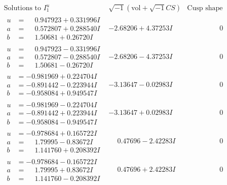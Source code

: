 \documentclass[1p]{elsarticle_modified}
\theoremstyle{definition}
\newcommand{\I}{\sqrt{-1}}
\begin{document}
$$\begin{array}{c|c|c}  
\text{Solutions to }I^u_{1}& \I (\text{vol} + \sqrt{-1}CS) & \text{Cusp shape}\\
 \hline 
\begin{aligned}
u &= \phantom{-}0.947923 + 0.331996 I \\
a &= \phantom{-}0.572807 + 0.288540 I \\
b &= \phantom{-}1.50681 + 0.26720 I\end{aligned}
 & -2.68206 + 4.37253 I & \phantom{-0.000000 } 0 \\ \hline\begin{aligned}
u &= \phantom{-}0.947923 - 0.331996 I \\
a &= \phantom{-}0.572807 - 0.288540 I \\
b &= \phantom{-}1.50681 - 0.26720 I\end{aligned}
 & -2.68206 - 4.37253 I & \phantom{-0.000000 } 0 \\ \hline\begin{aligned}
u &= -0.981969 + 0.224704 I \\
a &= -0.891442 - 0.223944 I \\
b &= -0.958084 + 0.949547 I\end{aligned}
 & -3.13647 - 0.02983 I & \phantom{-0.000000 } 0 \\ \hline\begin{aligned}
u &= -0.981969 - 0.224704 I \\
a &= -0.891442 + 0.223944 I \\
b &= -0.958084 - 0.949547 I\end{aligned}
 & -3.13647 + 0.02983 I & \phantom{-0.000000 } 0 \\ \hline\begin{aligned}
u &= -0.978684 + 0.165722 I \\
a &= \phantom{-}1.79995 - 0.83672 I \\
b &= \phantom{-}1.141760 + 0.208392 I\end{aligned}
 & \phantom{-}0.47696 - 2.42283 I & \phantom{-0.000000 } 0 \\ \hline\begin{aligned}
u &= -0.978684 - 0.165722 I \\
a &= \phantom{-}1.79995 + 0.83672 I \\
b &= \phantom{-}1.141760 - 0.208392 I\end{aligned}
 & \phantom{-}0.47696 + 2.42283 I & \phantom{-0.000000 } 0 \\ \hline\begin{aligned}

\end{aligned}
\end{array}$$
\end{document}
